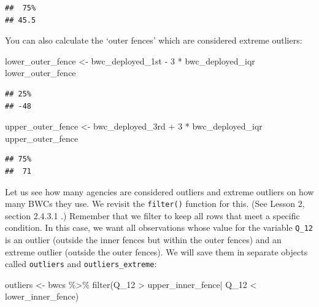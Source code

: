 \documentclass[
]{book}
\newenvironment{Shaded}{\begin{snugshade}}{\end{snugshade}}
\newcommand{\DecValTok}[1]{\textcolor[rgb]{0.00,0.00,0.81}{#1}}
\newcommand{\FunctionTok}[1]{\textcolor[rgb]{0.00,0.00,0.00}{#1}}
\newcommand{\NormalTok}[1]{#1}
\newcommand{\OtherTok}[1]{\textcolor[rgb]{0.56,0.35,0.01}{#1}}
\newcommand{\SpecialCharTok}[1]{\textcolor[rgb]{0.00,0.00,0.00}{#1}}
\begin{document}
\begin{verbatim}
##  75% 
## 45.5
\end{verbatim}

You can also calculate the `outer fences' which are considered extreme outliers:

\begin{Shaded}
\begin{Highlighting}[]
\NormalTok{lower\_outer\_fence }\OtherTok{\textless{}{-}}\NormalTok{ bwc\_deployed\_1st }\SpecialCharTok{{-}} \DecValTok{3} \SpecialCharTok{*}\NormalTok{ bwc\_deployed\_iqr }
\NormalTok{lower\_outer\_fence}
\end{Highlighting}
\end{Shaded}

\begin{verbatim}
## 25% 
## -48
\end{verbatim}

\begin{Shaded}
\begin{Highlighting}[]
\NormalTok{upper\_outer\_fence }\OtherTok{\textless{}{-}}\NormalTok{ bwc\_deployed\_3rd }\SpecialCharTok{+} \DecValTok{3} \SpecialCharTok{*}\NormalTok{ bwc\_deployed\_iqr }
\NormalTok{upper\_outer\_fence}
\end{Highlighting}
\end{Shaded}

\begin{verbatim}
## 75% 
##  71
\end{verbatim}

Let us see how many agencies are considered outliers and extreme outliers on how many BWCs they use. We revisit the \texttt{filter()} function for this. (See Lesson 2, section 2.4.3.1 .) Remember that we filter to keep all rows that meet a specific condition. In this case, we want all observations whose value for the variable \texttt{Q\_12} is an outlier (outside the inner fences but within the outer fences) and an extreme outlier (outside the outer fences). We will save them in separate objects called \texttt{outliers} and \texttt{outliers\_extreme}:

\begin{Shaded}
\begin{Highlighting}[]
\NormalTok{outliers }\OtherTok{\textless{}{-}}\NormalTok{ bwcs }\SpecialCharTok{\%\textgreater{}\%} 
  \FunctionTok{filter}\NormalTok{(Q\_12 }\SpecialCharTok{\textgreater{}}\NormalTok{ upper\_inner\_fence}\SpecialCharTok{|}\NormalTok{ Q\_12 }\SpecialCharTok{\textless{}}\NormalTok{ lower\_inner\_fence) }
\end{Highlighting}
\end{Shaded}
\end{document}
